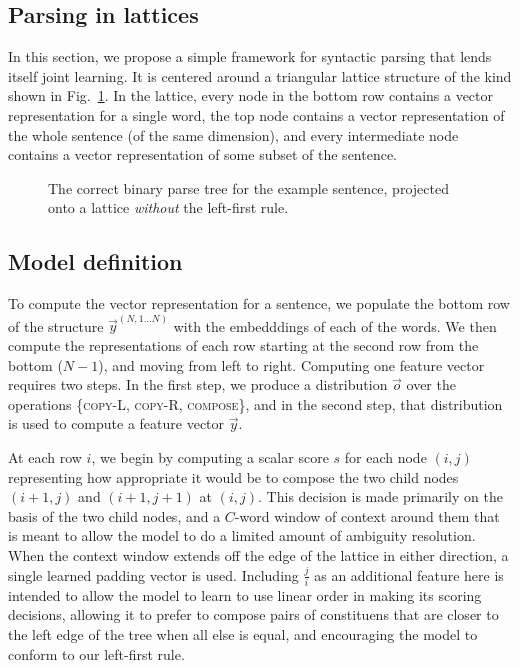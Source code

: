 \subsection{Parsing in lattices} 

In this section, we propose a simple framework for syntactic parsing that lends itself joint learning. It is centered around a triangular lattice structure of the kind shown in Fig.~\ref{lattice-fig1}. In the lattice, every node in the bottom row contains a vector representation for a single word, the top node contains a vector representation of the whole sentence (of the same dimension), and every intermediate node contains a vector representation of some subset of the sentence.

\begin{figure}[tp]
  \centering\small
 	

        \caption{The correct binary parse tree for the example sentence, projected onto a lattice \textit{without} the left-first rule.}
  \label{lattice-fig1}
\end{figure}



\subsection{Model definition}



To compute the vector representation for a sentence, we populate the bottom row of the structure $\vec{y}^{(N,1...N)}$ with the embedddings of each of the words. We then compute the representations of each row starting at the second row from the bottom ($N - 1$), and moving from left to right. Computing one feature vector requires two steps. In the first step, we produce a distribution $\vec{o}$ over the operations \{\textsc{copy-L, copy-R, compose}\}, and in the second step, that distribution is used to compute a feature vector $\vec{y}$.

At each row $i$, we begin by computing a scalar score $s$ for each node $(i, j)$ representing how appropriate it would be to compose the two child nodes $(i+1, j)$ and $(i+1, j+1)$ at $(i, j)$. This decision is made primarily on the basis of the two child nodes, and a $C$-word window of context around them that is meant to allow the model to do a limited amount of ambiguity resolution. When the context window extends off the edge of the lattice in either direction, a single learned padding vector is used. %
Including $\frac{j}{i}$ as an additional feature here is intended to allow the model to learn to use linear order in making its scoring decisions, allowing it to prefer to compose pairs of constituens that are closer to the left edge of the tree when all else is equal, and encouraging the model to conform to our left-first rule.


